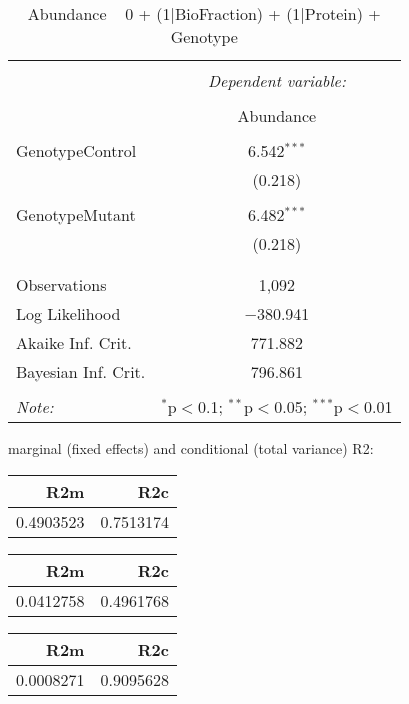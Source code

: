 \documentclass[11pt]{report}
\begin{document}
\begin{table}[!htbp] \centering 
  \caption{Abundance ~ 0 + (1|BioFraction) + (1|Protein) + Genotype} 
  \label{} 
\begin{tabular}{@{\extracolsep{5pt}}lc} 
\\[-1.8ex]\hline 
\hline \\[-1.8ex] 
 & \multicolumn{1}{c}{\textit{Dependent variable:}} \\ 
\cline{2-2} 
\\[-1.8ex] & Abundance \\ 
\hline \\[-1.8ex] 
 GenotypeControl & 6.542$^{***}$ \\ 
  & (0.218) \\ 
  & \\ 
 GenotypeMutant & 6.482$^{***}$ \\ 
  & (0.218) \\ 
  & \\ 
\hline \\[-1.8ex] 
Observations & 1,092 \\ 
Log Likelihood & $-$380.941 \\ 
Akaike Inf. Crit. & 771.882 \\ 
Bayesian Inf. Crit. & 796.861 \\ 
\hline 
\hline \\[-1.8ex] 
\textit{Note:}  & \multicolumn{1}{r}{$^{*}$p$<$0.1; $^{**}$p$<$0.05; $^{***}$p$<$0.01} \\ 
\end{tabular} 
\end{table} 
marginal (fixed effects) and conditional (total variance) R2:

\begin{tabular}{r|r}
\hline
R2m & R2c\\
\hline
0.4903523 & 0.7513174\\
\hline
\end{tabular}

\begin{tabular}{r|r}
\hline
R2m & R2c\\
\hline
0.0412758 & 0.4961768\\
\hline
\end{tabular}

\begin{tabular}{r|r}
\hline
R2m & R2c\\
\hline
0.0008271 & 0.9095628\\
\hline
\end{tabular}
\end{document}
